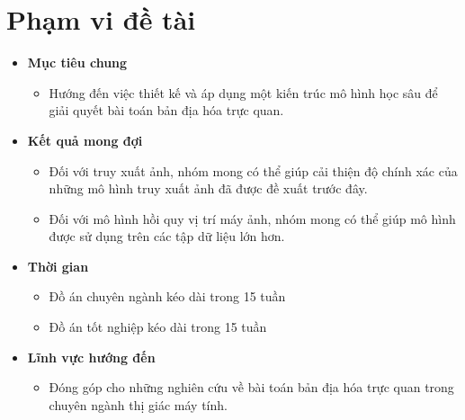 \section{Phạm vi đề tài}
\begin{itemize}
    \item \textbf{Mục tiêu chung} 
    \begin{itemize}
        \item Hướng đến việc thiết kế và áp dụng một kiến trúc mô hình học sâu để giải quyết bài toán bản địa hóa trực quan.
    \end{itemize} 
    \item \textbf{Kết quả mong đợi}
    \begin{itemize}
        \item Đối với truy xuất ảnh, nhóm mong có thể giúp cải thiện độ chính xác của những mô hình truy xuất ảnh đã được đề xuất trước đây.
        \item Đối với mô hình hồi quy vị trí máy ảnh, nhóm mong có thể giúp mô hình được sử dụng trên các tập dữ liệu lớn hơn.
    \end{itemize}
    \item \textbf{Thời gian}
    \begin{itemize}
        \item Đồ án chuyên ngành kéo dài trong 15 tuần
        \item Đồ án tốt nghiệp kéo dài trong 15 tuần
    \end{itemize}
    \item \textbf{Lĩnh vực hướng đến}
    \begin{itemize}
        \item Đóng góp cho những nghiên cứu về bài toán bản địa hóa trực quan trong chuyên ngành thị giác máy tính.
    \end{itemize}
    
\end{itemize}

